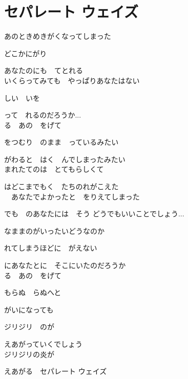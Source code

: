 \section{ セパレート ウェイズ}
\large{

あのときめきがくなってしまった

どこかにがり

あなたのにも　てとれる
\\

いくらってみても　やっぱりあなたはない

しい　いを

って　れるのだろうか...
\\

る　あの　をげて

をつむり　のまま　っているみたい

がわると　はく　んでしまったみたい
\\

まれたてのは　とてもらしくて

はどこまでもく　たちのれがこえた
\\

　あなたでよかったと　をりえてしまった

でも　のあなたには　そう どうでもいいことでしょう...

なままのがいったいどうなのか

れてしまうほどに　がえない

にあなたとに　そこにいたのだろうか
\\

る　あの　をげて

もらぬ　らぬへと

がいになっても

ジリジリ　のが

えあがっていくでしょう
\\

ジリジリの炎が

えあがる　セパレート ウェイズ

}